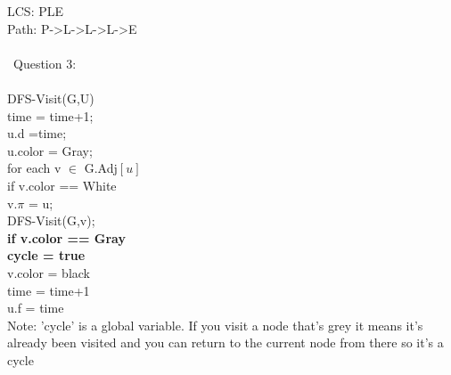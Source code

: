 \documentclass[12pt]{article}
\newcommand\tab[1][1cm]{\hspace*{#1}}
\begin{document}
\tab LCS: PLE \\
\tab\tab Path: P->L->L->L->E\\\\\
Question 3:\\\\
\tab\tab DFS-Visit(G,U)\\
\tab\tab\tab time = time+1;\\
\tab\tab\tab u.d =time;\\
\tab\tab\tab u.color = Gray;\\
\tab\tab\tab for each v $\in$ G.Adj$[u]$\\
\tab\tab\tab\tab if v.color == White\\
\tab\tab\tab\tab\tab v.$\pi$ = u;\\
\tab\tab\tab\tab\tab DFS-Visit(G,v);\\
\tab\tab\tab\tab \textbf{if v.color == Gray\\
\tab\tab\tab\tab\tab cycle = true}\\
\tab\tab\tab v.color = black\\
\tab\tab\tab time = time+1\\
\tab\tab\tab u.f = time\\
Note: 'cycle' is a global variable. If you visit a node that's grey it means it's already been visited and you can return to the current node from there so it's a cycle\\
\end{document}
